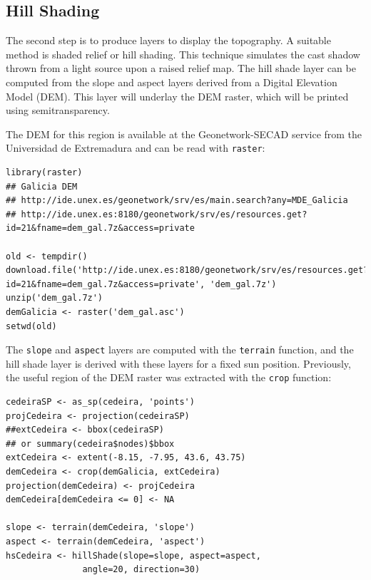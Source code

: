 \documentclass[smallroyalvopaper]{memoir}
\begin{document}
\subsection{Hill Shading}
\label{sec-1-2}

The second step is to produce layers to display the topography. A
suitable method is shaded relief or hill shading. This technique
simulates the cast shadow thrown from a light source upon a raised
relief map. The hill shade layer can be computed from the slope and
aspect layers derived from a Digital Elevation Model (DEM). This layer
will underlay the DEM raster, which will be printed using
semitransparency.

The DEM for this region is available at the Geonetwork-SECAD service
from the Universidad de Extremadura and can be read with \texttt{raster}:


\lstset{language=R,numbers=none}
\begin{lstlisting}
library(raster)
## Galicia DEM
## http://ide.unex.es/geonetwork/srv/es/main.search?any=MDE_Galicia
## http://ide.unex.es:8180/geonetwork/srv/es/resources.get?id=21&fname=dem_gal.7z&access=private

old <- tempdir()
download.file('http://ide.unex.es:8180/geonetwork/srv/es/resources.get?id=21&fname=dem_gal.7z&access=private', 'dem_gal.7z')
unzip('dem_gal.7z')
demGalicia <- raster('dem_gal.asc')
setwd(old)
\end{lstlisting}

The \texttt{slope} and \texttt{aspect} layers are computed with the \texttt{terrain}
function, and the hill shade layer is derived with these layers for a
fixed sun position. Previously, the useful region of the DEM raster
was extracted with the \texttt{crop} function:


\lstset{language=R,numbers=none}
\begin{lstlisting}
cedeiraSP <- as_sp(cedeira, 'points')
projCedeira <- projection(cedeiraSP)
##extCedeira <- bbox(cedeiraSP) 
## or summary(cedeira$nodes)$bbox
extCedeira <- extent(-8.15, -7.95, 43.6, 43.75)
demCedeira <- crop(demGalicia, extCedeira)
projection(demCedeira) <- projCedeira
demCedeira[demCedeira <= 0] <- NA

slope <- terrain(demCedeira, 'slope')
aspect <- terrain(demCedeira, 'aspect')
hsCedeira <- hillShade(slope=slope, aspect=aspect,
		       angle=20, direction=30)
\end{lstlisting}
\end{document}

